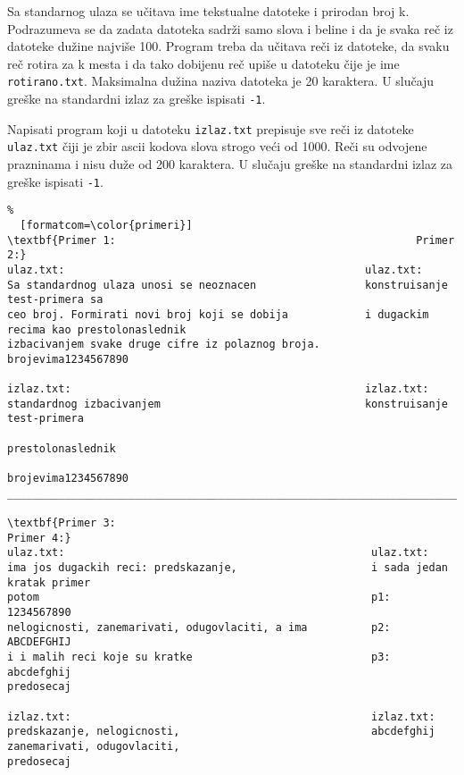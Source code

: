 \documentclass{article}
\begin{document}
\begin{z} Sa standarnog ulaza se u\v citava ime tekstualne datoteke i prirodan
broj k. Podrazumeva se da zadata datoteka sadr\v zi samo slova i
beline i da je svaka re\v c iz datoteke du\v zine najvi\v se
100. Program treba da u\v citava re\v ci iz datoteke, da svaku re\v c
rotira za k mesta i da tako dobijenu re\v c upi\v se u datoteku \v
cije je ime \verb|rotirano.txt|. Maksimalna du\v zina naziva datoteka je 20 karaktera. U slu\v caju gre\v ske
na standardni izlaz za greške ispisati {\tt -1}.
\end{z}

\begin{z}
Napisati program koji u datoteku \verb|izlaz.txt| prepisuje sve re\v{c}i iz datoteke
\verb|ulaz.txt| \v{c}iji je zbir ascii kodova slova strogo ve\'{c}i od 1000. Re\v ci su
odvojene prazninama i nisu du\v ze od  200 karaktera. U slu\v caju gre\v ske
na standardni izlaz za greške ispisati {\tt -1}.
\end{z}
\begin{Verbatim}%
  [formatcom=\color{primeri}]
\textbf{Primer 1:                                               Primer 2:}
ulaz.txt:                                               ulaz.txt:
Sa standardnog ulaza unosi se neoznacen                 konstruisanje test-primera sa
ceo broj. Formirati novi broj koji se dobija            i dugackim recima kao prestolonaslednik
izbacivanjem svake druge cifre iz polaznog broja.       brojevima1234567890

izlaz.txt:                                              izlaz.txt:
standardnog izbacivanjem                                konstruisanje test-primera
                                                        prestolonaslednik
                                                        brojevima1234567890
______________________________________________________________________________________________________________

\textbf{Primer 3:                                                Primer 4:}
ulaz.txt:                                                ulaz.txt:
ima jos dugackih reci: predskazanje,                     i sada jedan kratak primer
potom                                                    p1: 1234567890
nelogicnosti, zanemarivati, odugovlaciti, a ima          p2: ABCDEFGHIJ
i i malih reci koje su kratke                            p3: abcdefghij
predosecaj

izlaz.txt:                                               izlaz.txt:
predskazanje, nelogicnosti,                              abcdefghij
zanemarivati, odugovlaciti,
predosecaj
\end{Verbatim} 
\end{document}
